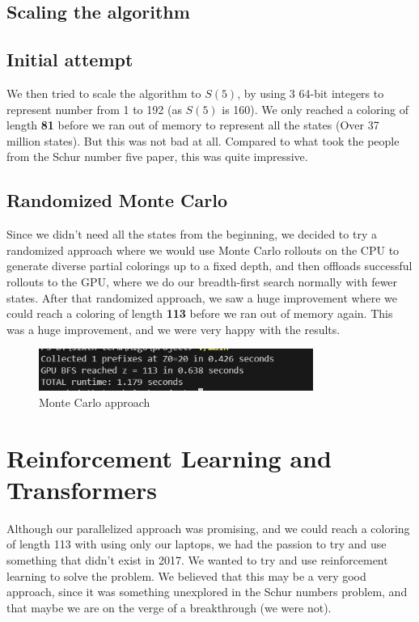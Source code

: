 \documentclass[12pt]{article}
\begin{document}
\subsection{Scaling the algorithm}
\subsection{Initial attempt}
We then tried to scale the algorithm to $S(5)$, by using 3 64-bit integers to represent number from 1 to 192 (as $S(5)$ is 160). We only reached a coloring of length \textbf{81} before we ran out of memory to represent all the states (Over 37 million states). But this was not bad at all. Compared to what took the people from the Schur number five paper, this was quite impressive. 

\subsection{Randomized Monte Carlo}
Since we didn't need all the states from the beginning, we decided to try a randomized approach where we would use Monte Carlo rollouts on the CPU to generate diverse partial colorings up to a fixed depth, and then offloads successful rollouts to the GPU, where we do our breadth-first search normally with fewer states. After that randomized approach, we saw a huge improvement where we could reach a coloring of length \textbf{113} before we ran out of memory again. This was a huge improvement, and we were very happy with the results. 
\begin{figure}
    \centering
    \includegraphics[width=0.8\textwidth]{images/montecarlo.jpg}
    \caption{Monte Carlo approach}
    \label{fig:monteCarlo}
\end{figure}


\section{Reinforcement Learning and Transformers}
Although our parallelized approach was promising, and we could reach a coloring of length 113 with using only our laptops, we had the passion to try and use something that didn't exist in 2017. We wanted to try and use reinforcement learning to solve the problem. We believed that this may be a very good approach, since it was something unexplored in the Schur numbers problem, and that maybe we are on the verge of a breakthrough (we were not).  
\end{document}
